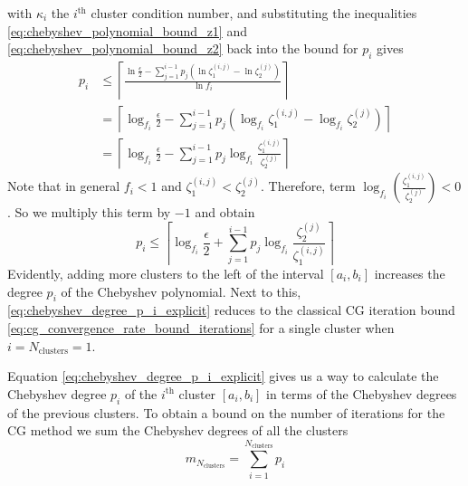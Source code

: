 with $\kappa_i$ the $i^{\text{th}}$ cluster condition number, and substituting the inequalities \ref{eq:chebyshev_polynomial_bound_z1} and \ref{eq:chebyshev_polynomial_bound_z2} back into the bound for $p_i$ gives
\begin{align*}
    p_i &\leq \left\lceil\frac{\ln{\frac{\epsilon}{2}} - \sum_{j=1}^{i-1} p_j\left(\ln{\zeta^{(i,j)}_1} - \ln{\zeta^{(j)}_2} \right)}{\ln{f_i}}\right\rceil \\
    &= \left\lceil\log_{f_i}{\frac{\epsilon}{2}} - \sum_{j=1}^{i-1} p_j\left(\log_{f_i}{\zeta^{(i,j)}_1} - \log_{f_i}{\zeta^{(j)}_2} \right)\right\rceil\\
    &= \left\lceil\log_{f_i}{\frac{\epsilon}{2}} - \sum_{j=1}^{i-1} p_j\log_{f_i}{\frac{\zeta^{(i,j)}_1}{\zeta^{(j)}_2}} \right\rceil
\end{align*}
Note that in general $f_i < 1$ and $\zeta^{(i,j)}_1 < \zeta^{(j)}_2$. Therefore, term $\log_{f_i}{\left(\frac{\zeta^{(i,j)}_1}{\zeta^{(j)}_2}\right)} < 0$. So we multiply this term by $-1$ and obtain
\begin{equation}
    p_i \leq \left\lceil\log_{f_i}{\frac{\epsilon}{2}} + \sum_{j=1}^{i-1} p_j\log_{f_i}{\frac{\zeta^{(j)}_2}{\zeta^{(i,j)}_1}} \right\rceil
    \label{eq:chebyshev_degree_p_i_explicit}
\end{equation}
Evidently, adding more clusters to the left of the interval $[a_i,b_i]$ increases the degree $p_i$ of the Chebyshev polynomial. Next to this, \cref{eq:chebyshev_degree_p_i_explicit} reduces to the classical CG iteration bound \cref{eq:cg_convergence_rate_bound_iterations} for a single cluster when $i = N_{\text{clusters}} = 1$.

Equation \ref{eq:chebyshev_degree_p_i_explicit} gives us a way to calculate the Chebyshev degree $p_i$ of the $i^{\text{th}}$ cluster $[a_i,b_i]$ in terms of the Chebyshev degrees of the previous clusters. To obtain a bound on the number of iterations for the CG method we sum the Chebyshev degrees of all the clusters
\begin{equation}
    m_{N_{\text{clusters}}} = \sum_{i=1}^{N_{\text{clusters}}} p_i
    \label{eq:cg_iteration_bound_multiple_clusters}
\end{equation}

